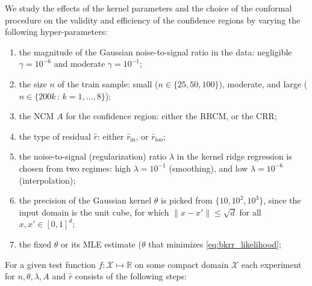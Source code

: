 \documentclass[a4paper,14pt]{extarticle}
\newcommand{\Xcal}{\mathcal{X}}
\newcommand{\Real}{\mathbb{R}}
\begin{document}
We study the effects of the kernel parameters and the choice of the conformal procedure
on the validity and efficiency of the confidence regions by varying the following
hyper-parameters: \begin{enumerate}
  \item the magnitude of the Gaussian noise-to-signal ratio in the data: negligible
  $\gamma = 10^{-6}$ and moderate $\gamma = 10^{-1}$;
  \item the size $n$ of the train sample: small ($n \in \{ 25, 50, 100\}$),
  moderate, and large ($n \in \{200 k\,:\, k=1, \ldots, 8 \}$);
  \item the NCM $A$ for the confidence region: either the RRCM, or the CRR;
  \item the type of residual $\hat{r}$: either $\hat{r}_{\text{in}}$, or $\hat{r}_{\text{loo}}$;
  \item the noise-to-signal (regularization) ratio $\lambda$ in the kernel ridge
  regression is chosen from two regimes: high $\lambda = 10^{-1}$ (smoothing), and
  low $\lambda=10^{-6}$ (interpolation);
  \item the precision of the Gaussian kernel $\theta$ is picked from
  $\{10, 10^2, 10^3\}$, since the input domain is the unit cube, for which
  $\|x-x'\| \leq \sqrt{d}$ for all $x,x'\in[0,1]^d$;
  \item the fixed $\theta$ or its MLE estimate ($\theta$ that minimizes \ref{eq:bkrr_likelihood};
\end{enumerate}
For a given test function $f:\Xcal \mapsto \Real$ on some compact domain $\Xcal$
each experiment for $n, \theta, \lambda, A$ and $\hat{r}$ consists of the following
steps:
\end{document}
